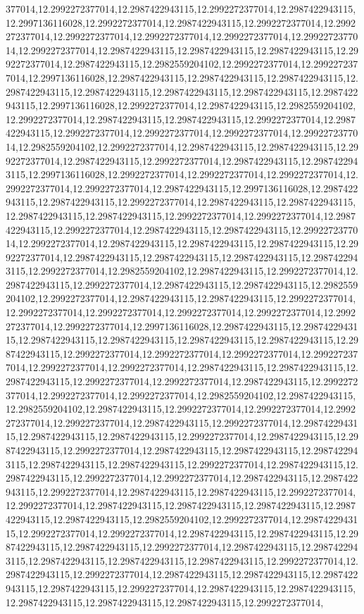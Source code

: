 \begin{pylabcode}[plotsession]
377014,12.2992272377014,12.2987422943115,12.2992272377014,12.2987422943115,12.2997136116028,12.2992272377014,12.2987422943115,12.2992272377014,12.2992272377014,12.2992272377014,12.2992272377014,12.2992272377014,12.2992272377014,12.2992272377014,12.2987422943115,12.2987422943115,12.2987422943115,12.2992272377014,12.2987422943115,12.2982559204102,12.2992272377014,12.2992272377014,12.2997136116028,12.2987422943115,12.2987422943115,12.2987422943115,12.2987422943115,12.2987422943115,12.2987422943115,12.2987422943115,12.2987422943115,12.2997136116028,12.2992272377014,12.2987422943115,12.2982559204102,12.2992272377014,12.2987422943115,12.2987422943115,12.2992272377014,12.2987422943115,12.2992272377014,12.2992272377014,12.2992272377014,12.2992272377014,12.2982559204102,12.2992272377014,12.2987422943115,12.2987422943115,12.2992272377014,12.2987422943115,12.2992272377014,12.2987422943115,12.2987422943115,12.2997136116028,12.2992272377014,12.2992272377014,12.2992272377014,12.2992272377014,12.2992272377014,12.2987422943115,12.2997136116028,12.2987422943115,12.2987422943115,12.2992272377014,12.2987422943115,12.2987422943115,12.2987422943115,12.2987422943115,12.2992272377014,12.2992272377014,12.2987422943115,12.2992272377014,12.2987422943115,12.2987422943115,12.2992272377014,12.2992272377014,12.2987422943115,12.2987422943115,12.2987422943115,12.2992272377014,12.2987422943115,12.2987422943115,12.2987422943115,12.2987422943115,12.2992272377014,12.2982559204102,12.2987422943115,12.2992272377014,12.2987422943115,12.2992272377014,12.2987422943115,12.2987422943115,12.2982559204102,12.2992272377014,12.2987422943115,12.2987422943115,12.2992272377014,12.2992272377014,12.2992272377014,12.2992272377014,12.2992272377014,12.2992272377014,12.2992272377014,12.2997136116028,12.2987422943115,12.2987422943115,12.2987422943115,12.2987422943115,12.2987422943115,12.2987422943115,12.2987422943115,12.2992272377014,12.2992272377014,12.2992272377014,12.2992272377014,12.2992272377014,12.2992272377014,12.2987422943115,12.2987422943115,12.2987422943115,12.2992272377014,12.2992272377014,12.2987422943115,12.2992272377014,12.2992272377014,12.2992272377014,12.2982559204102,12.2987422943115,12.2982559204102,12.2987422943115,12.2992272377014,12.2992272377014,12.2992272377014,12.2992272377014,12.2987422943115,12.2992272377014,12.2987422943115,12.2987422943115,12.2987422943115,12.2992272377014,12.2987422943115,12.2987422943115,12.2992272377014,12.2987422943115,12.2987422943115,12.2987422943115,12.2987422943115,12.2987422943115,12.2992272377014,12.2987422943115,12.2987422943115,12.2992272377014,12.2992272377014,12.2987422943115,12.2987422943115,12.2992272377014,12.2987422943115,12.2987422943115,12.2992272377014,12.2992272377014,12.2987422943115,12.2987422943115,12.2987422943115,12.2987422943115,12.2987422943115,12.2982559204102,12.2992272377014,12.2987422943115,12.2992272377014,12.2992272377014,12.2987422943115,12.2987422943115,12.2987422943115,12.2987422943115,12.2992272377014,12.2987422943115,12.2987422943115,12.2987422943115,12.2987422943115,12.2987422943115,12.2992272377014,12.2987422943115,12.2992272377014,12.2987422943115,12.2987422943115,12.2987422943115,12.2987422943115,12.2992272377014,12.2987422943115,12.2987422943115,12.2987422943115,12.2987422943115,12.2987422943115,12.2992272377014,
\end{pylabcode}
